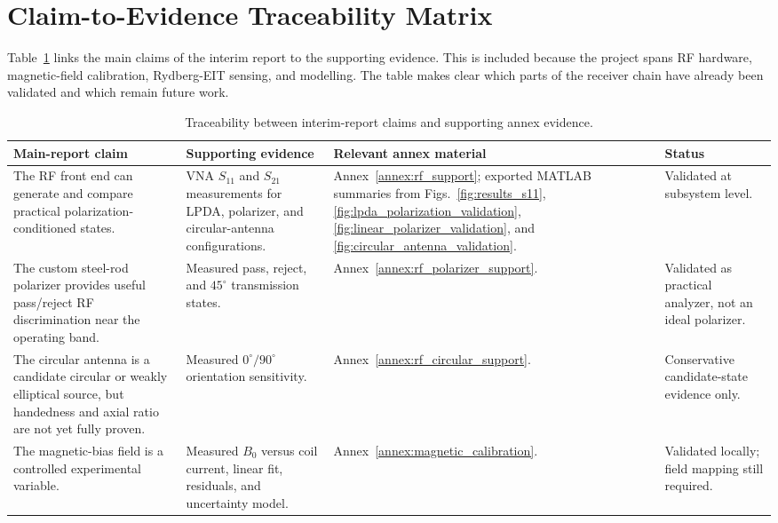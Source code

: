 \documentclass{ieeeaccess}
\begin{document}
\section{Claim-to-Evidence Traceability Matrix}\label{annex:traceability_matrix}

Table~\ref{tab:annex_claim_traceability} links the main claims of the interim report to the supporting evidence. This is included because the project spans RF hardware, magnetic-field calibration, Rydberg-EIT sensing, and modelling. The table makes clear which parts of the receiver chain have already been validated and which remain future work.

\begin{table}[!t]
\caption{Traceability between interim-report claims and supporting annex evidence.}
\label{tab:annex_claim_traceability}
\centering
\renewcommand{\arraystretch}{1.12}
\scriptsize
\begin{tabular}{p{} p{} p{} p{}}
\hline
\textbf{Main-report claim} & \textbf{Supporting evidence} & \textbf{Relevant annex material} & \textbf{Status} \\
\hline
The RF front end can generate and compare practical polarization-conditioned states. &
VNA \(S_{11}\) and \(S_{21}\) measurements for LPDA, polarizer, and circular-antenna configurations. &
Annex~\ref{annex:rf_support}; exported MATLAB summaries from Figs.~\ref{fig:results_s11}, \ref{fig:lpda_polarization_validation}, \ref{fig:linear_polarizer_validation}, and \ref{fig:circular_antenna_validation}. &
Validated at subsystem level. \\

The custom steel-rod polarizer provides useful pass/reject RF discrimination near the operating band. &
Measured pass, reject, and \(45^\circ\) transmission states. &
Annex~\ref{annex:rf_polarizer_support}. &
Validated as practical analyzer, not an ideal polarizer. \\

The circular antenna is a candidate circular or weakly elliptical source, but handedness and axial ratio are not yet fully proven. &
Measured \(0^\circ/90^\circ\) orientation sensitivity. &
Annex~\ref{annex:rf_circular_support}. &
Conservative candidate-state evidence only. \\

The magnetic-bias field is a controlled experimental variable. &
Measured \(B_0\) versus coil current, linear fit, residuals, and uncertainty model. &
Annex~\ref{annex:magnetic_calibration}. &
Validated locally; field mapping still required. \\


\end{tabular}
\end{table}
\end{document}

